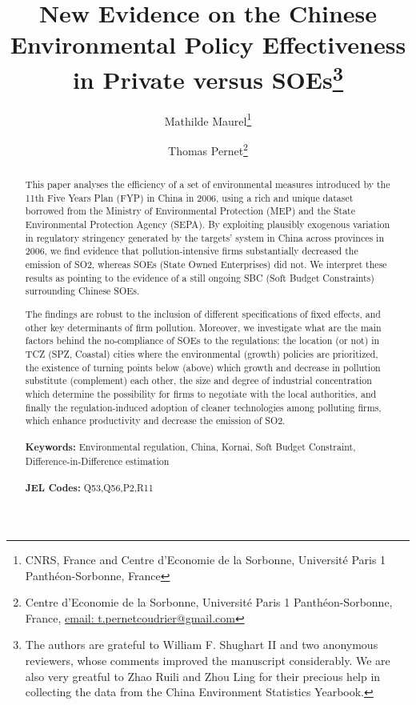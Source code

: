 \documentclass[12pt]{article}
\begin{document}
\begin{titlepage}


\title{New Evidence on the Chinese Environmental Policy Effectiveness in Private versus SOEs\thanks{The authors are grateful to William F. Shughart II and two anonymous reviewers, whose comments improved the manuscript considerably. We are also very greatful to Zhao Ruili and Zhou Ling for their precious help in collecting the data from the China Environment Statistics Yearbook.}}
\author{
Mathilde Maurel\thanks{CNRS, France and Centre d'Economie de la Sorbonne, Université Paris 1 Panthéon-Sorbonne, France} 
\and Thomas Pernet\thanks{Centre d'Economie de la Sorbonne, Université Paris 1 Panthéon-Sorbonne, France,
\href{mailto:t.pernetcoudrier@gmail.com}{email: t.pernetcoudrier@gmail.com} 
}
}

\date{}

\maketitle
\begin{abstract}
\noindent This paper analyses the efficiency of a set of environmental measures introduced by the 11th Five Years Plan (FYP) in China in 2006, using a rich and unique dataset borrowed from the Ministry of Environmental Protection (MEP) and the State Environmental Protection Agency (SEPA). By exploiting plausibly exogenous variation in regulatory stringency generated by the targets' system in China across provinces in 2006, we find evidence that pollution-intensive firms substantially decreased the emission of SO2, whereas SOEs (State Owned Enterprises) did not. We interpret these results as pointing to the evidence of a still ongoing SBC (Soft Budget Constraints) surrounding Chinese SOEs. 

The findings are robust to the inclusion of different specifications of fixed effects, and other key determinants of firm pollution. Moreover, we investigate what are the main factors behind the no-compliance of SOEs to the regulations: the location (or not) in TCZ (SPZ, Coastal) cities where the environmental (growth) policies are prioritized, the existence of turning points below (above) which growth and decrease in pollution substitute (complement) each other, the size and degree of industrial concentration which determine the possibility for firms to negotiate with the local authorities, and finally the regulation-induced adoption of cleaner technologies among polluting firms, which enhance productivity and decrease the emission of SO2.  \\
\vspace{0em}\\
\noindent\textbf{Keywords:} Environmental regulation, China, Kornai, Soft Budget Constraint, Difference-in-Difference estimation\\
\vspace{0em}\\
\noindent\textbf{JEL Codes:} Q53,Q56,P2,R11
\\

\bigskip
\end{abstract}
\setcounter{page}{0}
\thispagestyle{empty}
\end{titlepage}
\end{document}
